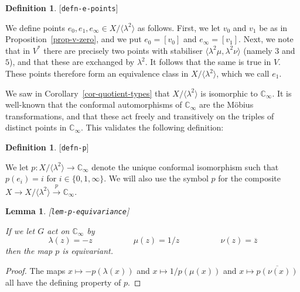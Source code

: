 \documentclass[reqno]{amsart}
\newcommand{\lbl}[1]{\label{#1}\textup{[\texttt{#1}]}\par}
\newcommand{\lbl}{\label}
\newcommand{\lm}        {\lambda}
\newcommand{\xra}       {\xrightarrow}
\newcommand{\C}         {{\mathbb{C}}}
\newcommand{\ov}[1]     {\overline{#1}}
\newcommand{\ip}[1]     {\langle #1\rangle}
\renewcommand{\:}{\colon}
\newtheorem{lemma}[theorem]{Lemma}
\theoremstyle{definition}
\newtheorem{definition}[theorem]{Definition}
\begin{document}
\begin{definition}\lbl{defn-e-points}
 We define points $e_0,e_1,e_\infty\in X/\ip{\lm^2}$ as follows.
 First, we let $v_0$ and $v_1$ be as in Proposition~\ref{prop-v-zero},
 and we put $e_0=[v_0]$ and $e_\infty=[v_1]$.  Next, we note that in
 $V^*$ there are precisely two points with stabiliser
 $\ip{\lm^2\mu,\lm^2\nu}$ (namely $3$ and $5$), and that these are
 exchanged by $\lm^2$.  It follows that the same is true in $V$.
 These points therefore form an equivalence class in $X/\ip{\lm^2}$,
 which we call $e_1$.
\end{definition}

We saw in Corollary~\ref{cor-quotient-types} that $X/\ip{\lm^2}$ is
isomorphic to $\C_\infty$.  It is well-known that the conformal
automorphisms of $\C_\infty$ are the M\"obius transformations, and
that these act freely and transitively on the triples of distinct
points in $\C_\infty$.  This validates the following definition:
\begin{definition}\lbl{defn-p}
 We let $p\:X/\ip{\lm^2}\to\C_\infty$ denote the unique conformal
 isomorphism such that $p(e_i)=i$ for $i\in\{0,1,\infty\}$.  We will
 also use the symbol $p$ for the composite
 $X\to X/\ip{\lm^2}\xra{p}\C_\infty$.
\end{definition}

\begin{lemma}\lbl{lem-p-equivariance}
 If we let $G$ act on $\C_\infty$ by
 \[ \lm(z)=-z \hspace{5em}
    \mu(z)=1/z \hspace{5em}
    \nu(z)=\ov{z}
 \]
 then the map $p$ is equivariant.
\end{lemma}
\begin{proof}
 The maps $x\mapsto -p(\lm(x))$ and $x\mapsto 1/p(\mu(x))$ and
 $x\mapsto \ov{p(\nu(x))}$ all have the defining property of $p$.
\end{proof}
\end{document}
